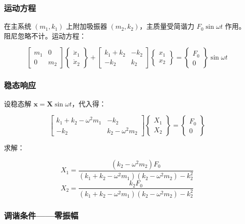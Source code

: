 \subsubsection{运动方程}

在主系统 $(m_1, k_1)$ 上附加吸振器 $(m_2, k_2)$，主质量受简谐力 $F_0\sin\omega t$ 作用。阻尼忽略不计。运动方程：

\[
\begin{bmatrix} m_1 & 0 \\ 0 & m_2 \end{bmatrix}
\begin{Bmatrix} \ddot{x}_1 \\ \ddot{x}_2 \end{Bmatrix} + 
\begin{bmatrix} k_1 + k_2 & -k_2 \\ -k_2 & k_2 \end{bmatrix}
\begin{Bmatrix} x_1 \\ x_2 \end{Bmatrix} = 
\begin{Bmatrix} F_0 \\ 0 \end{Bmatrix} \sin\omega t
\]

\subsubsection{稳态响应}

设稳态解 $\mathbf{x} = \mathbf{X}\sin\omega t$，代入得：

\[
\begin{bmatrix} k_1 + k_2 - \omega^2 m_1 & -k_2 \\ -k_2 & k_2 - \omega^2 m_2 \end{bmatrix}
\begin{Bmatrix} X_1 \\ X_2 \end{Bmatrix} = 
\begin{Bmatrix} F_0 \\ 0 \end{Bmatrix}
\]

求解：

\begin{myformula}
\[
X_1 = \frac{(k_2 - \omega^2 m_2)F_0}{(k_1 + k_2 - \omega^2 m_1)(k_2 - \omega^2 m_2) - k_2^2}
\]
\[
X_2 = \frac{k_2 F_0}{(k_1 + k_2 - \omega^2 m_1)(k_2 - \omega^2 m_2) - k_2^2}
\]
\end{myformula}

\subsubsection{调谐条件——零振幅}

